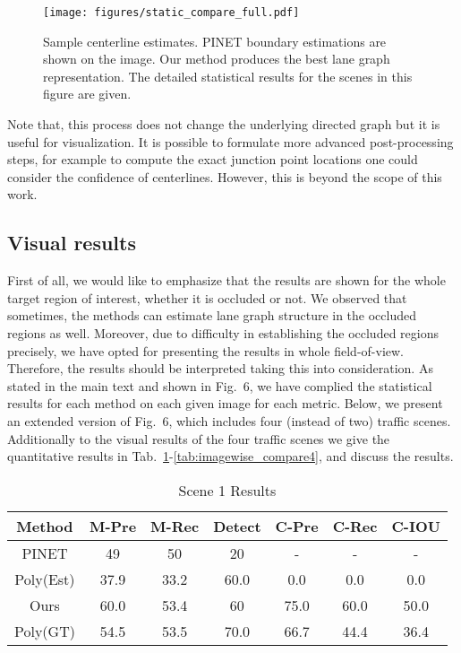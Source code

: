 \documentclass[10pt,twocolumn,letterpaper]{article}
\begin{document}
\begin{figure*}
    \centering
    \texttt{[image: figures/static\_compare\_full.pdf]}
    \caption{Sample centerline estimates. PINET boundary estimations are shown on the image. Our method produces the best lane graph representation. The detailed statistical results for the scenes in this figure are given.}
    \label{fig:lane-visual}
\end{figure*}

Note that, this process does not change the underlying directed graph but it is useful for visualization. It is possible to formulate more advanced post-processing steps, for example to compute the exact junction point locations one could consider the confidence of centerlines. However, this is beyond the scope of this work.

\subsection{Visual results}
First of all, we would like to emphasize that the results are shown for the whole target region of interest, whether it is occluded or not. We observed that sometimes, the methods can estimate lane graph structure in the occluded regions as well. Moreover, due to difficulty in establishing the occluded regions precisely, we have opted for presenting the results in whole field-of-view. Therefore, the results should be interpreted taking this into consideration.
As stated in the main text and shown in Fig.~6, we have complied the statistical results for each method on each given image for each metric. Below, we present an extended version of Fig.~6, which includes four (instead of two) traffic scenes. Additionally to the visual results of the four traffic scenes we give the quantitative results in Tab.~\ref{tab:imagewise_compare1}-\ref{tab:imagewise_compare4}, and discuss the results. 



\begin{table}[h]
\begin{center}
\tabcolsep=0.08cm
\begin{tabular}{ |c|c|c|c|c|c|c| }

\hline
Method & M-Pre & M-Rec & Detect & C-Pre & C-Rec & C-IOU  \\
\hline

PINET & 49& 50& 20&-& -& - \\ 

Poly(Est) & 37.9&  33.2& 60.0& 0.0& 0.0&  0.0 \\

Ours& 60.0& 53.4&  60& 75.0& 60.0&  50.0\\
\hline
Poly(GT) & 54.5& 53.5&  70.0&  66.7&  44.4& 36.4  \\
\hline
\end{tabular}
\end{center}
\vspace{-1em}
\caption{Scene 1 Results}
\label{tab:imagewise_compare1}
\end{table}
\end{document}
